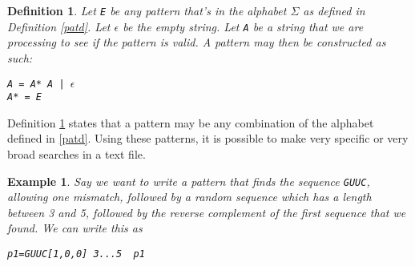 \documentclass[11pt,twoside,a4paper]{article}
\newtheorem{definition}{Definition}
\newtheorem{example}{Example}
\begin{document}
\begin{definition}\label{patc}
Let {\tt E} be any pattern that's in the alphabet $\Sigma$ as defined in Definition \ref{patd}. 
Let $\epsilon$ be the empty string.
Let {\tt A} be a string that we are processing to see if the pattern is valid.
A pattern may then be constructed as such: \begin{center}
{\tt A = A* A | $\epsilon$}\\
{\tt A* = E}\end{center}
\end{definition}
Definition \ref{patc} states that a pattern may be any combination of the alphabet 
defined in \ref{patd}.
Using these patterns, it is possible to make very specific or very broad 
searches in a text file. 

\begin{example}
Say we want to write a pattern that finds the sequence {\tt GUUC}, allowing 
one mismatch, followed by a random sequence which has a length between 3 and 5, 
followed by the reverse complement of the first sequence that we found. We can 
write this as \begin{center}
{\tt p1=GUUC[1,0,0] 3...5 ~p1}
\end{center}
\end{example}
\end{document}
